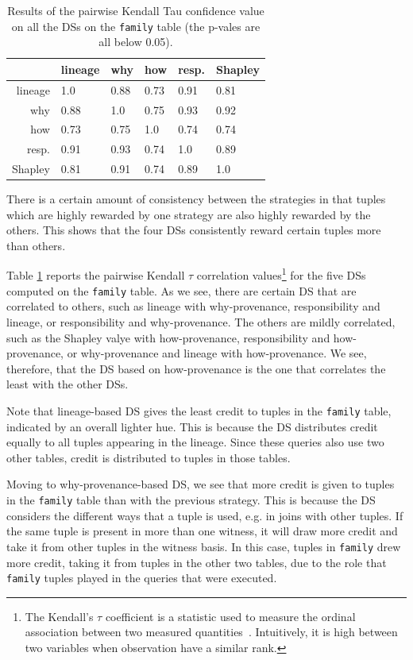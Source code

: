 \documentclass[preprint,12pt,sort&compress]{elsarticle}
\newcommand{\rtwo}[1]{\textcolor{reviewer2}{#1}}
\begin{document}
\begin{table}[]
\center
  \caption{\rtwo{Results of the pairwise Kendall Tau confidence value on all the DSs on the \texttt{family} table (the p-vales are all below 0.05).}}
  \begin{tabular}{|r|l|l|l|l|l|}
  \hline
 & lineage & why & how & resp. & Shapley \\
  \hline
 lineage & 1.0 & 0.88 & 0.73 & 0.91  & 0.81 \\
why & 0.88 & 1.0 & 0.75 & 0.93 & 0.92 \\
 how & 0.73 & 0.75 & 1.0 & 0.74 & 0.74  \\
 resp. & 0.91 & 0.93 & 0.74 & 1.0 & 0.89 \\
Shapley & 0.81 & 0.91 & 0.74 & 0.89 & 1.0 \\
 \hline
  \end{tabular}
  \label{table:kendall_tau}
\end{table}
\normalsize


There is a certain amount of consistency between the strategies in that tuples which are highly rewarded by one strategy are also highly rewarded by the others. This shows that the four DSs consistently reward certain tuples more than others. 

\rtwo{Table \ref{table:kendall_tau} reports the pairwise Kendall $\tau$ correlation values\footnote{The Kendall's $\tau$ coefficient is a statistic used to measure the ordinal association between two measured quantities~\cite{Kendall1938new}. Intuitively, it is high between two variables when observation have a similar rank.} for the five DSs computed on the \texttt{family} table. As we see, there are certain DS that are correlated to others, such as lineage with why-provenance, responsibility and lineage, or responsibility and why-provenance. 
The others are mildly correlated, such as the Shapley valye with how-provenance, responsibility and how-provenance, or why-provenance and lineage with how-provenance. We see, therefore, that the DS based on how-provenance is the one that correlates the least with the other DSs.}

Note that lineage-based DS gives the least credit to tuples in the \texttt{family} table, indicated by an overall lighter hue. This is because the DS  distributes credit equally to all tuples appearing in the lineage. Since these queries also use two other tables, credit is distributed to tuples in those tables.

Moving to why-provenance-based DS, we see that more credit is given to tuples in the \texttt{family} table than with the previous strategy. This is because the DS considers the different ways that a tuple is used, e.g. in joins with other tuples. If the same tuple is present in more than one witness, it will draw more credit and take it from  other tuples in the witness basis. In this case, tuples in \texttt{family} drew more credit, taking it from tuples in the other two tables, due to the role that \texttt{family}  tuples played in the queries that were executed. 
\end{document}
